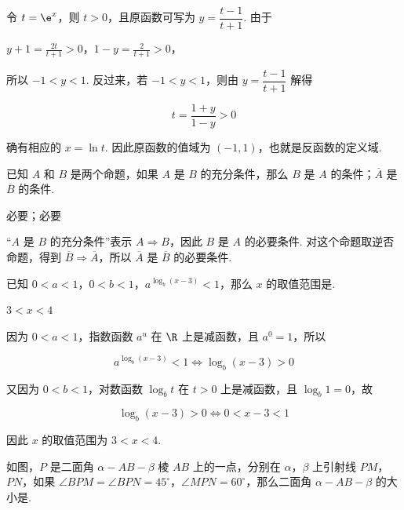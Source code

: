 \begin{solution}
令 \(t=\e^x\)，则 \(t>0\)，且原函数可写为 \(y=\dfrac{t-1}{t+1}\). 由于

\(y+1=\frac{2t}{t+1}>0\)，\(1-y=\frac{2}{t+1}>0\)，

所以 \(-1<y<1\). 反过来，若 \(-1<y<1\)，则由 \(y=\dfrac{t-1}{t+1}\) 解得

\[t=\frac{1+y}{1-y}>0\]

确有相应的 \(x=\ln t\). 因此原函数的值域为 \(\left(-1,1\right)\)，也就是反函数的定义域.
\end{solution}

\begin{problem}
已知 \(A\) 和 \(B\) 是两个命题，如果 \(A\) 是 \(B\) 的充分条件，那么 \(B\) 是 \(A\) 的\fillinblank{}条件；\(\overline{A}\) 是 \(\overline{B}\) 的\fillinblank{}条件.
\end{problem}

\begin{answer}
必要；必要
\end{answer}

\begin{solution}
“\(A\) 是 \(B\) 的充分条件”表示 \(A\Rightarrow B\)，因此 \(B\) 是 \(A\) 的必要条件. 对这个命题取逆否命题，得到 \(\overline{B}\Rightarrow\overline{A}\)，所以 \(\overline{A}\) 是 \(\overline{B}\) 的必要条件.
\end{solution}

\begin{problem}
已知 \(0 < a < 1\)，\(0 < b < 1\)，\(a^{\log_b(x - 3)} < 1\)，那么 \(x\) 的取值范围是\fillinblank{}.
\end{problem}

\begin{answer}
\(3<x<4\)
\end{answer}

\begin{solution}
因为 \(0<a<1\)，指数函数 \(a^u\) 在 \(\R\) 上是减函数，且 \(a^0=1\)，所以

\[a^{\log_b(x-3)}<1\Longleftrightarrow \log_b(x-3)>0\]

又因为 \(0<b<1\)，对数函数 \(\log_b t\) 在 \(t>0\) 上是减函数，且 \(\log_b1=0\)，故

\[\log_b(x-3)>0\Longleftrightarrow 0<x-3<1\]

因此 \(x\) 的取值范围为 \(3<x<4\).
\end{solution}

\begin{problem}
如图，\(P\) 是二面角 \(\alpha - AB - \beta\) 棱 \(AB\) 上的一点，分别在 \(\alpha\)，\(\beta\) 上引射线 \(PM\)，\(PN\)，如果 \(\angle BPM = \angle BPN = 45^\circ\)，\(\angle MPN = 60^\circ\)，那么二面角 \(\alpha - AB - \beta\) 的大小是\fillinblank{}.

\end{problem}

